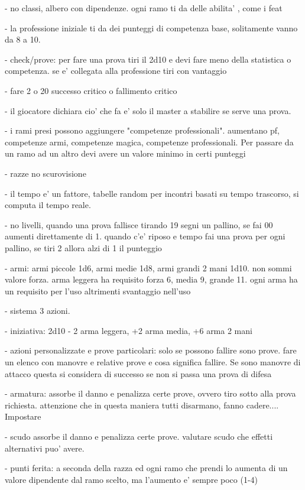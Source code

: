 \documentclass[12pt,a4paper,twoside,openany,twocolumn]{book}
\begin{document}
- no classi, albero con dipendenze. ogni ramo ti da delle abilita' , come i feat

- la professione iniziale ti da dei punteggi di competenza base, solitamente vanno da 8 a 10.

- check/prove: per fare una prova tiri il 2d10 e devi fare meno della statistica o competenza. se e' collegata alla professione tiri con vantaggio

- fare 2 o 20  successo critico o fallimento  critico

- il giocatore dichiara cio' che fa e' solo il master a stabilire se serve una prova. 

- i rami presi possono aggiungere "competenze professionali". aumentano pf, competenze armi, competenze magica, competenze professionali. Per passare da un ramo ad un altro devi avere un valore minimo in certi punteggi

- razze no scurovisione

- il tempo e' un fattore, tabelle random per incontri basati su tempo trascorso, si computa il tempo reale.

- no livelli, quando una prova fallisce tirando 19 segni un pallino, se fai 00 aumenti direttamente di 1. quando c'e' riposo e tempo fai una prova per ogni pallino, se tiri 2 allora alzi di 1 il punteggio

- armi: armi piccole 1d6, armi medie 1d8, armi grandi 2 mani 1d10. non sommi valore forza. arma leggera ha requisito forza 6, media 9, grande 11. ogni arma ha un requisito per l'uso altrimenti svantaggio nell'uso

- sistema 3 azioni.

- iniziativa: 2d10 - 2 arma leggera, +2 arma media, +6 arma 2 mani

- azioni personalizzate e prove particolari: solo se possono fallire sono prove. fare un elenco con manovre e relative prove e cosa significa fallire. Se sono manovre di attacco questa si considera di successo se non si passa una prova di difesa

- armatura: assorbe il danno e penalizza certe prove, ovvero tiro sotto alla prova richiesta. attenzione che in questa maniera tutti disarmano, fanno cadere.... Impostare 

- scudo assorbe il danno e penalizza certe prove. valutare scudo che effetti alternativi puo' avere.

- punti ferita: a seconda della razza ed ogni ramo che prendi lo aumenta di un valore dipendente dal ramo scelto, ma l'aumento e' sempre poco (1-4)
\end{document}
